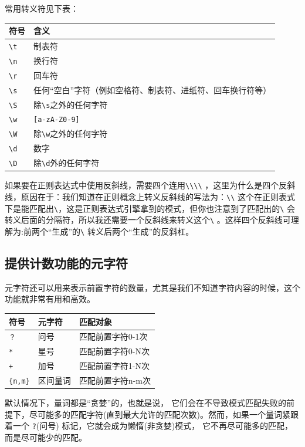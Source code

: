 \documentclass[]{ctexbook}
\begin{document}
常用转义符见下表：

\begin{longtable}[]{@{}ll@{}}
\toprule
符号 & 含义\tabularnewline
\midrule
\endhead
\texttt{\textbackslash{}t} & 制表符\tabularnewline
\texttt{\textbackslash{}n} & 换行符\tabularnewline
\texttt{\textbackslash{}r} & 回车符\tabularnewline
\texttt{\textbackslash{}s} & 任何``空白''字符（例如空格符、制表符、进纸符、回车换行符等）\tabularnewline
\texttt{\textbackslash{}S} & 除\texttt{\textbackslash{}s}之外的任何字符\tabularnewline
\texttt{\textbackslash{}w} & \texttt{{[}a-zA-Z0-9{]}}\tabularnewline
\texttt{\textbackslash{}W} & 除\texttt{\textbackslash{}w}之外的任何字符\tabularnewline
\texttt{\textbackslash{}d} & 数字\tabularnewline
\texttt{\textbackslash{}D} & 除\texttt{\textbackslash{}d}外的任何字符\tabularnewline
\bottomrule
\end{longtable}

如果要在正则表达式中使用反斜线，需要四个连用\texttt{\textbackslash{}\textbackslash{}\textbackslash{}\textbackslash{}}
，这里为什么是四个反斜线，原因在于：我们知道在正则概念上转义反斜线的写法为：\texttt{\textbackslash{}\textbackslash{}} 这个在正则表式下是能匹配出\texttt{\textbackslash{}}，这是正则表达式引擎拿到的模式，但你也注意到了匹配出的\texttt{\textbackslash{}} 会转义后面的分隔符，所以我还需要一个反斜线来转义这个\texttt{\textbackslash{}} 。这样四个反斜线可理解为:前两个``生成''的\texttt{\textbackslash{}} 转义后两个``生成''的反斜杠。

\hypertarget{ux63d0ux4f9bux8ba1ux6570ux529fux80fdux7684ux5143ux5b57ux7b26}{%
\subsection{提供计数功能的元字符}\label{ux63d0ux4f9bux8ba1ux6570ux529fux80fdux7684ux5143ux5b57ux7b26}}

元字符还可以用来表示前置字符的数量，尤其是我们不知道字符内容的时候，这个功能就非常有用和高效。

\begin{longtable}[]{@{}lll@{}}
\toprule
符号 & 元字符 & 匹配对象\tabularnewline
\midrule
\endhead
\texttt{？} & 问号 & 匹配前置字符0-1次\tabularnewline
\texttt{*} & 星号 & 匹配前置字符0-N次\tabularnewline
\texttt{+} & 加号 & 匹配前置字符1-N次\tabularnewline
\texttt{\{n,m\}} & 区间量词 & 匹配前置字符n-m次\tabularnewline
\bottomrule
\end{longtable}

默认情况下，量词都是``贪婪''的，也就是说， 它们会在不导致模式匹配失败的前提下，尽可能多的匹配字符(直到最大允许的匹配次数)。然而，如果一个量词紧跟着一个 \texttt{?}(问号) 标记，它就会成为懒惰(非贪婪)模式， 它不再尽可能多的匹配，而是尽可能少的匹配。
\end{document}
